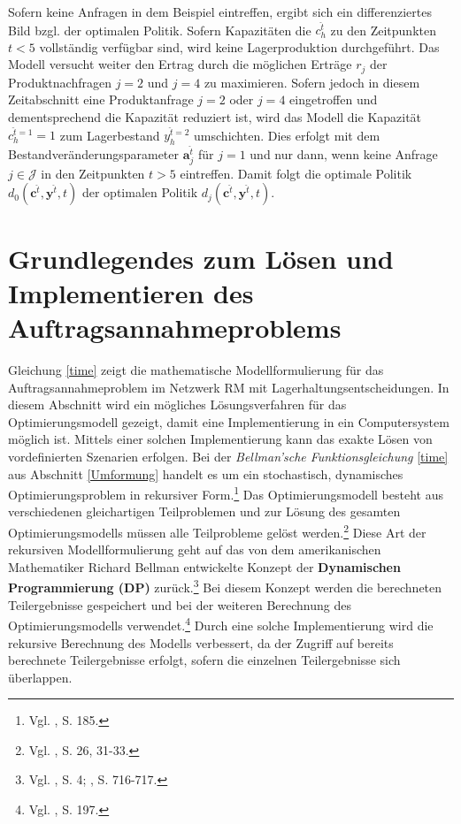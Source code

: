 Sofern keine Anfragen in dem Beispiel eintreffen, ergibt sich ein differenziertes Bild bzgl. der optimalen Politik. Sofern Kapazitäten die $c_{h}^{\hat t}$ zu den Zeitpunkten $t<5$ vollständig verfügbar sind, wird keine Lagerproduktion durchgeführt. Das Modell versucht weiter den Ertrag durch die möglichen Erträge $r_j$ der Produktnachfragen $j=2$ und $j=4$ zu maximieren. Sofern jedoch in diesem Zeitabschnitt eine Produktanfrage $j=2$ oder $j=4$ eingetroffen und dementsprechend die Kapazität reduziert ist, wird das Modell die Kapazität $c_{h}^{\hat t=1}=1$ zum Lagerbestand $y_{h}^{\hat t=2}$ umschichten. Dies erfolgt mit dem Bestandveränderungsparameter $\textbf{a}_j^{\hat t}$ für $j=1$ und nur dann, wenn keine Anfrage $j\in\mathcal{J}$ in den Zeitpunkten $t>5$ eintreffen. Damit folgt die optimale Politik $d_{0}({\textbf{c}^{\hat t},\textbf{y}^{\hat t}, t})$ der optimalen Politik $d_{j}({\textbf{c}^{\hat t},\textbf{y}^{\hat t}, t})$.


\section{Grundlegendes zum Lösen und Implementieren des Auftragsannahmeproblems}\label{Implementierung}

Gleichung \eqref{time} zeigt die mathematische Modellformulierung für das Auftragsannahmeproblem im Netzwerk RM mit Lagerhaltungsentscheidungen. In diesem Abschnitt wird ein mögliches Lösungsverfahren für das Optimierungsmodell gezeigt, damit eine Implementierung in ein Computersystem möglich ist. Mittels einer solchen Implementierung kann das exakte Lösen von vordefinierten Szenarien erfolgen. Bei der \textit{Bellman'sche Funktionsgleichung} \eqref{time} aus Abschnitt \ref{Umformung} handelt es um ein stochastisch, dynamisches Optimierungsproblem in rekursiver Form.\footnote{Vgl. \cite{Petrick:2009aa}, S. 185.} Das Optimierungsmodell besteht aus verschiedenen gleichartigen Teilproblemen und zur Lösung des gesamten Optimierungsmodells müssen alle Teilprobleme gelöst werden.\footnote{Vgl. \cite{powell2007approximate}, S. 26, 31-33.} Diese Art der rekursiven Modellformulierung geht auf das von dem amerikanischen Mathematiker Richard Bellman entwickelte Konzept der \textbf{Dynamischen Programmierung (DP)} zurück.\footnote{Vgl. \cite{bellman1954theory}, S. 4; \cite{Bellman:1952aa}, S. 716-717.} Bei diesem Konzept werden die berechneten Teilergebnisse gespeichert und bei der weiteren Berechnung des Optimierungsmodells verwendet.\footnote{Vgl. \cite{owsnicki1999algorithmen}, S. 197.} Durch eine solche Implementierung wird die rekursive Berechnung des Modells verbessert, da der Zugriff auf bereits berechnete Teilergebnisse erfolgt, sofern die einzelnen Teilergebnisse sich überlappen.

